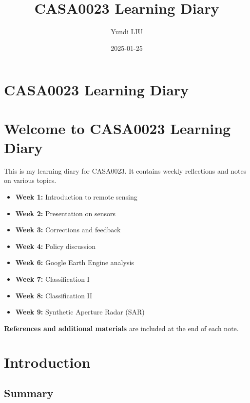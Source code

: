\documentclass[
  letterpaper,
  DIV=11,
  numbers=noendperiod]{scrreprt}
\title{CASA0023 Learning Diary}
\author{Yundi LIU}
\date{2025-01-25}
\providecommand{\tightlist}{%
  \setlength{\itemsep}{0pt}\setlength{\parskip}{0pt}}\usepackage{longtable,booktabs,array}
\renewcommand*\contentsname{Table of contents}
\newcommand\contentsname{Table of contents}
\begin{document}
\maketitle

\renewcommand*\contentsname{Table of contents}
{
\hypersetup{linkcolor=}
\setcounter{tocdepth}{2}
\tableofcontents
}

\chapter{CASA0023 Learning Diary}\label{casa0023-learning-diary}


\chapter{Welcome to CASA0023 Learning
Diary}\label{welcome-to-casa0023-learning-diary}

This is my learning diary for CASA0023. It contains weekly reflections
and notes on various topics.

\begin{itemize}
\tightlist
\item
  \textbf{Week 1:} Introduction to remote sensing
\item
  \textbf{Week 2:} Presentation on sensors
\item
  \textbf{Week 3:} Corrections and feedback
\item
  \textbf{Week 4:} Policy discussion
\item
  \textbf{Week 6:} Google Earth Engine analysis
\item
  \textbf{Week 7:} Classification I
\item
  \textbf{Week 8:} Classification II
\item
  \textbf{Week 9:} Synthetic Aperture Radar (SAR)
\end{itemize}

\textbf{References and additional materials} are included at the end of
each note.


\chapter{Introduction}\label{introduction}

\section{Summary}\label{summary}
\end{document}

